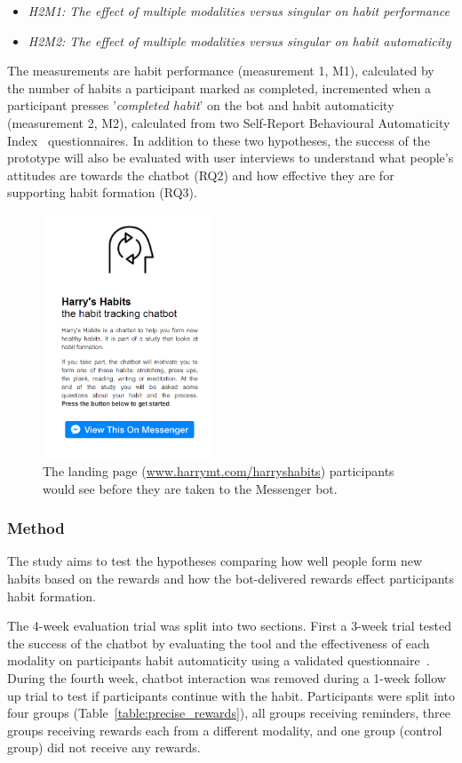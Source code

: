 \begin{itemize}
  \item \textit{H2M1: The effect of multiple modalities versus singular on habit performance}
  \item \textit{H2M2: The effect of multiple modalities versus singular on habit automaticity}
\end{itemize}

The measurements are habit performance (measurement 1, M1), calculated by the number of habits a participant marked as completed, incremented when a participant presses '\textit{completed habit}' on the bot and habit automaticity (measurement 2, M2), calculated from two Self-Report Behavioural Automaticity Index~\cite{article_4q_SRBAI} questionnaires. In addition to these two hypotheses, the success of the prototype will also be evaluated with user interviews to understand what people's attitudes are towards the chatbot (RQ2) and how effective they are for supporting habit formation (RQ3).

\begin{figure}[H]
  \centering
  \includegraphics[width=2in]{resources/design/process/harryshabits-landing-page.png}
  \caption{The landing page (\url{www.harrymt.com/harryshabits}) participants would see before they are taken to the Messenger bot.}
  \label{fig:landing_page}
\end{figure}

\subsubsection{Method}
The study aims to test the hypotheses comparing how well people form new habits based on the rewards and how the bot-delivered rewards effect participants habit formation.


The 4-week evaluation trial was split into two sections. First a 3-week trial tested the success of the chatbot by evaluating the tool and the effectiveness of each modality on participants habit automaticity using a validated questionnaire~\cite{article_4q_SRBAI}. During the fourth week, chatbot interaction was removed during a 1-week follow up trial to test if participants continue with the habit. Participants were split into four groups (Table~\ref{table:precise_rewards}), all groups receiving reminders, three groups receiving rewards each from a different modality, and one group (control group) did not receive any rewards.


